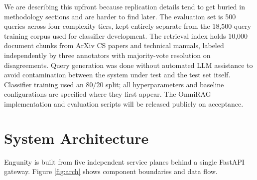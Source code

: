 \documentclass[conference]{IEEEtran}
\begin{document}
We are describing this upfront because replication details tend to get buried in methodology sections and are harder to find later. The evaluation set is 500 queries across four complexity tiers, kept entirely separate from the 18,500-query training corpus used for classifier development. The retrieval index holds 10,000 document chunks from ArXiv CS papers and technical manuals, labeled independently by three annotators with majority-vote resolution on disagreements. Query generation was done without automated LLM assistance to avoid contamination between the system under test and the test set itself. Classifier training used an 80/20 split; all hyperparameters and baseline configurations are specified where they first appear. The OmniRAG implementation and evaluation scripts will be released publicly on acceptance.

\section{System Architecture}

Engunity is built from five independent service planes behind a single FastAPI gateway. Figure \ref{fig:arch} shows component boundaries and data flow.
\end{document}
